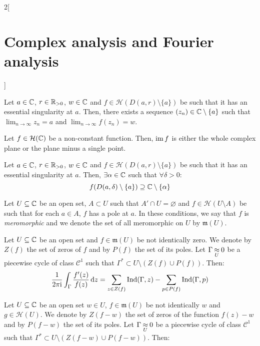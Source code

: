 \documentclass[../../../main.tex]{subfiles}
\begin{document}
\begin{multicols}{2}[\section{Complex analysis and Fourier analysis}]
\begin{theorem}
  \end{theorem}
  \begin{corollary}
    Let $a\in\mathbb{C}$, $r\in\mathbb{R}_{>0}$, $w\in\mathbb{C}$ and $f\in\mathcal{H}(D(a,r)\setminus\{a\})$ be such that it has an essential singularity at $a$. Then, there exists a sequence $(z_n)\in\mathbb{C}\setminus\{a\}$ such that $\displaystyle\lim_{n\to\infty}z_n=a$ and $\displaystyle\lim_{n\to\infty}f(z_n)=w$.
  \end{corollary}
  \begin{theorem}
    Let $f\in\mathcal{H}(\mathbb{C})$ be a non-constant function. Then, $\operatorname{im} f$ is either the whole complex plane or the plane minus a single point.
  \end{theorem}
  \begin{theorem}
    Let $a\in\mathbb{C}$, $r\in\mathbb{R}_{>0}$, $w\in\mathbb{C}$ and $f\in\mathcal{H}(D(a,r)\setminus\{a\})$ be such that it has an essential singularity at $a$. Then, $\exists\alpha\in\mathbb{C}$ such that $\forall \delta>0$: $$f(D(a,\delta)\setminus\{a\})\supseteq\mathbb{C}\setminus\{\alpha\}$$
  \end{theorem}
  \begin{definition}
    Let $U\subseteq \mathbb{C}$ be an open set, $A\subset U$ such that $A'\cap U=\varnothing$ and $f\in\mathcal{H}(U\setminus A)$ be such that for each $a\in A$, $f$ has a pole at $a$. In these conditions, we say that $f$ is \emph{meromorphic} and we denote the set of all meromorphic on $U$ by $\mathfrak{m}(U)$.
  \end{definition}
  \begin{theorem}
    Let $U\subseteq \mathbb{C}$ be an open set and $f\in\mathfrak{m}(U)$ be not identically zero. We denote by $Z(f)$ the set of zeros of $f$ and by $P(f)$ the set of its poles. Let $\Gamma\mathbin{\underset{U}{\approx}} 0$ be a piecewise cycle of class $\mathcal{C}^1$ such that $\Gamma^*\subset U\setminus (Z(f)\cup P(f))$. Then:
    $$\frac{1}{2\pi\mathrm{i}}\int_{\Gamma}\frac{f'(z)}{f(z)}\dd{z}=\sum_{z\in Z(f)}\operatorname{Ind}(\Gamma,z)-\sum_{p\in P(f)}\operatorname{Ind}(\Gamma,p)$$
  \end{theorem}
  \begin{theorem}
    Let $U\subseteq \mathbb{C}$ be an open set $w\in U$, $f\in\mathfrak{m}(U)$ be not identically $w$ and $g\in\mathcal{H}(U)$. We denote by $Z(f-w)$ the set of zeros of the function $f(z)-w$ and by $P(f-w)$ the set of its poles. Let $\Gamma\mathbin{\underset{U}{\approx}} 0$ be a piecewise cycle of class $\mathcal{C}^1$ such that $\Gamma^*\subset U\setminus (Z(f-w)\cup P(f-w))$. Then:
    \begin{multline*}

\end{multline*}
\end{theorem}
\end{multicols}
\end{document}
